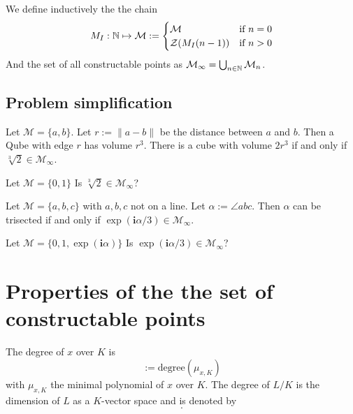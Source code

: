\documentclass{../Proof_layout_PDF/TemplateExercise}
\begin{document}
\begin{definition}
    We define inductively the the chain
    \begin{equation*}
         M_I :  \mathbb{N} \mapsto \mathcal{M} := \begin{cases}
            \mathcal{M} & \text{if } n = 0 \\
            \mathcal{Z}(M_I(n-1)) & \text{if } n > 0
        \end{cases}
    \end{equation*}
    And the set of all constructable points as $\mathcal{M}_{\infty} = \bigcup_{n \in \mathbb{N}} \mathcal{M}_n$.
\end{definition}

\subsection{Problem simplification}
Let $\mathcal{M} = \{a, b\}$. Let $r := \|a - b\|$ be the distance between $a$ and $b$. Then a Qube with edge $r$ has volume $r^3$.
There is a cube with volume $2r^3$ if and only if $\sqrt[3]{2} \in \mathcal{M}_{\infty}$.
\begin{problem}
    Let $\mathcal{M} = \{0,1\}$ Is $\sqrt[3]{2} \in \mathcal{M}_{\infty}$?
\end{problem}
Let $\mathcal{M} = \{a, b, c\}$ with $a, b, c$ not on a line. Let $\alpha := \angle abc$.
Then $\alpha$ can be trisected if and only if $\exp(\textbf{i}\alpha / 3) \in \mathcal{M}_{\infty}$.
\begin{problem}
    Let $\mathcal{M} = \{0,1,\exp(\textbf{i} \alpha)\}$ Is $\exp(\textbf{i} \alpha/3) \in \mathcal{M}_{\infty}$?
\end{problem}


\section{Properties of the the set of constructable points}
\begin{definition}
    The degree of $x$ over $K$ is
    \begin{equation*}
        [x:K] :=\text{degree}(\mu_{x,K})
        \end{equation*}
        with $\mu_{x,K}$ the minimal polynomial of $x$ over $K$. \newline
    The degree of $L/K$ is the dimension of $L$ as a $K$-vector space and is denoted by
    \begin{equation*}
        [L:K].
    \end{equation*}
\end{definition}
\end{document}

